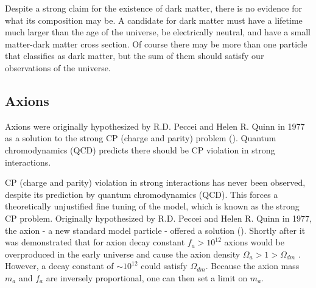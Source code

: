 





Despite a strong claim for the existence of dark matter, there is no evidence for what its composition may
be.  A candidate for dark matter must have a lifetime much larger than the age of the universe, be electrically
neutral, and have a small matter-dark matter cross section.  Of course there may be more than one particle
that classifies as dark matter, but the sum of them should satisfy our observations of the universe.

\subsection{Axions} \label{subsec:axions}
Axions were originally hypothesized by R.D. Peccei and Helen R. Quinn in 1977 as a solution to the strong CP
(charge and parity) problem ().  Quantum chromodynamics (QCD) predicts there should be
CP violation in strong interactions.

CP (charge and parity) violation in strong interactions has never been observed, despite its prediction
by quantum chromodynamics (QCD).  This forces a theoretically unjustified fine tuning of the model, which
is known as the strong CP problem.  Originally hypothesized by R.D. Peccei and Helen R. Quinn in 1977, the
axion - a new standard model particle - offered a solution ().  Shortly after it was
demonstrated that for axion decay constant $f_{a} > 10^{12}$ axions would be overproduced in the
early universe and cause the axion density $\Omega_{a} > 1 > \Omega_{dm}$ .  However,
a decay constant of $\sim 10^{12}$ could satisfy $\Omega_{dm}$.  Because the axion mass $m_{a}$ and $f_{a}$
are inversely proportional, one can then set a limit on $m_{a}$.

